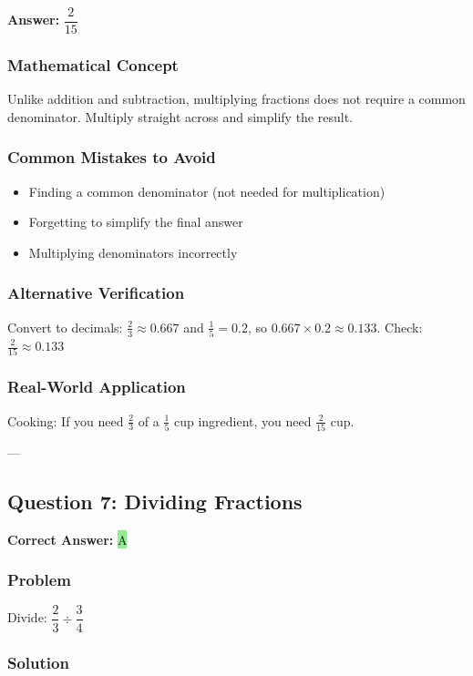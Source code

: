 \documentclass[12pt]{article}
\begin{document}
\textbf{Answer: } $\dfrac{2}{15}$

\subsubsection*{Mathematical Concept}
Unlike addition and subtraction, multiplying fractions does not require a common denominator. Multiply straight across and simplify the result.

\subsubsection*{Common Mistakes to Avoid}
\begin{itemize}
\item Finding a common denominator (not needed for multiplication)
\item Forgetting to simplify the final answer
\item Multiplying denominators incorrectly
\end{itemize}

\subsubsection*{Alternative Verification}
Convert to decimals: $\frac{2}{3} \approx 0.667$ and $\frac{1}{5} = 0.2$, so $0.667 \times 0.2 \approx 0.133$. Check: $\frac{2}{15} \approx 0.133$ 

\subsubsection*{Real-World Application}
Cooking: If you need $\frac{2}{3}$ of a $\frac{1}{5}$ cup ingredient, you need $\frac{2}{15}$ cup.

---

\subsection{Question 7: Dividing Fractions}

\textbf{Correct Answer: } \colorbox{lightgreen}{A}

\subsubsection*{Problem}
Divide: $\dfrac{2}{3} \div \dfrac{3}{4}$

\subsubsection*{Solution}
\end{document}
